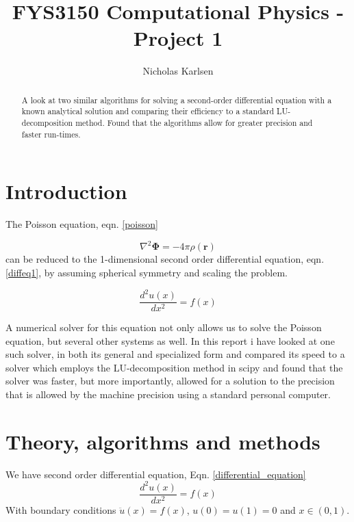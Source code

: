 \documentclass[10pt,showpacs,preprintnumbers,footinbib,amsmath,amssymb,aps,prl,twocolumn,groupedaddress,superscriptaddress,showkeys]{revtex4-1}
\begin{document}
\title{FYS3150 Computational Physics - Project 1}
\author{Nicholas Karlsen}

\begin{abstract}
  A look at two similar algorithms for solving a second-order differential equation with a known analytical solution and comparing their efficiency to a standard LU-decomposition method. Found that the algorithms allow for greater precision and faster run-times.
\end{abstract}

\maketitle

\section{Introduction}
  The Poisson equation, eqn. \ref{poisson}

  \begin{equation}
    \label{poisson}
    \nabla^2 \mathbf \Phi = - 4\pi \rho (\mathbf r)
  \end{equation}
  can be reduced to the 1-dimensional second order differential equation, eqn. \ref{diffeq1},
  by assuming spherical symmetry and scaling the problem.

  \begin{equation}
    \label{diffeq1}
    \frac{d^2u(x)}{dx^2} = f(x)
  \end{equation}

  A numerical solver for this equation not only allows us to solve the Poisson equation, but several other systems as well. In this report i have looked at one such solver, in both its general and specialized form and compared its speed to a solver which employs the LU-decomposition method in scipy and found that the solver was faster, but more importantly, allowed for a solution to the precision that is allowed by the machine precision using a standard personal computer.


\section{Theory, algorithms and methods}
We have second order differential equation, Eqn. \ref{differential_equation}
  \begin{equation}
    \label{differential_equation}
    \frac{d^2u(x)}{dx^2} = f(x)
  \end{equation}
  With boundary conditions $\ddot{u}(x) = f(x)$, $u(0) = u(1) = 0$ and $x \in (0, 1)$.
\end{document}
